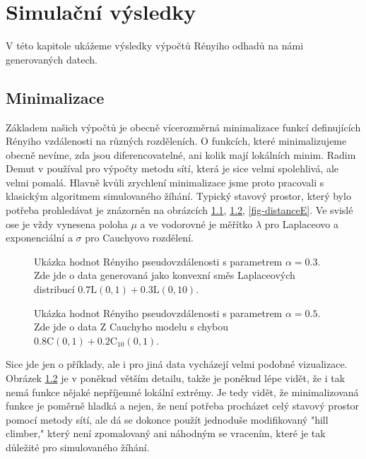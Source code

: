 \chapter{Simulační výsledky}
V této kapitole ukážeme výsledky výpočtů Rényiho odhadů na námi generovaných datech. 



\section{Minimalizace}
Základem našich výpočtů je obecně vícerozměrná minimalizace funkcí definujících Rényiho vzdálenosti na různých rozděleních. O funkcích, které minimalizujeme obecně nevíme, zda jsou diferencovatelné, ani kolik mají lokálních minim. Radim Demut v \cite{Demut2010} používal pro výpočty metodu sítí, která je sice velmi spolehlivá, ale velmi pomalá. Hlavně kvůli zrychlení minimalizace jsme proto pracovali s klasickým algoritmem simulovaného žíhání. Typický stavový prostor, který bylo potřeba prohledávat je znázorněn na obrázcích \ref{fig-distanceL}, \ref{fig-distanceC}, \ref{fig-distanceE}. Ve svislé ose je vždy vynesena poloha $\mu$ a ve vodorovné je měřítko $\lambda$ pro Laplaceovo a exponenciální a $\sigma$ pro Cauchyovo rozdělení.

\begin{figure}[htb!]
	\begin{center}
		\caption{Ukázka hodnot Rényiho pseudovzdálenosti s parametrem $\alpha = 0.3$. Zde jde o data generovaná jako konvexní směs Laplaceových distribucí $0.7\mathrm{L}(0,1) + 0.3 \mathrm{L}(0,10)$.}
		\label{fig-distanceL}
	\end{center}
\end{figure}

\begin{figure}[htb!]
	\begin{center}
		\caption{Ukázka hodnot Rényiho pseudovzdálenosti s parametrem $\alpha = 0.5$. Zde jde o data Z Cauchyho modelu s chybou $0.8\mathrm{C}(0,1) + 0.2 \mathrm{C}_{10}(0,1)$.}
		\label{fig-distanceC}
	\end{center}
\end{figure}

\noindent Sice jde jen o příklady, ale i pro jiná data vycházejí velmi podobné vizualizace. Obrázek \ref{fig-distanceC} je v poněkud větším detailu, takže je poněkud lépe vidět, že i tak nemá funkce nějaké nepříjemné lokální extrémy. Je tedy vidět, že minimalizovaná funkce je poměrně hladká a nejen, že není potřeba procházet celý stavový prostor pomocí metody sítí, ale dá se dokonce použít jednoduše modifikovaný "hill climber," který není zpomalovaný ani náhodným se vracením, které je tak důležité pro simulovaného žíhání. 

